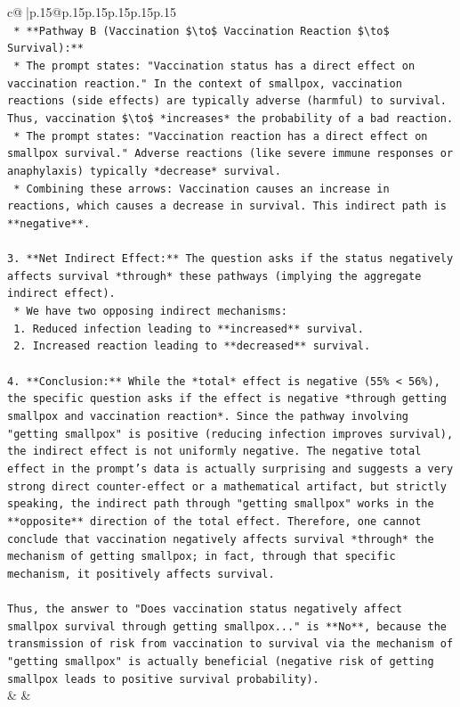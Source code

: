 \documentclass{article}
\begin{document}
{\begin{supertabular}{c@{$\;$}|p{.15\linewidth}@{}p{.15\linewidth}p{.15\linewidth}p{.15\linewidth}p{.15\linewidth}p{.15\linewidth}}
{{{\\ 
\texttt{    *   **Pathway B (Vaccination \$\textbackslash{}to\$ Vaccination Reaction \$\textbackslash{}to\$ Survival):**} \\
\texttt{        *   The prompt states: "Vaccination status has a direct effect on vaccination reaction." In the context of smallpox, vaccination reactions (side effects) are typically adverse (harmful) to survival. Thus, vaccination \$\textbackslash{}to\$ *increases* the probability of a bad reaction.} \\
\texttt{        *   The prompt states: "Vaccination reaction has a direct effect on smallpox survival." Adverse reactions (like severe immune responses or anaphylaxis) typically *decrease* survival.} \\
\texttt{        *   Combining these arrows: Vaccination causes an increase in reactions, which causes a decrease in survival. This indirect path is **negative**.} \\
\\ 
\texttt{3.  **Net Indirect Effect:** The question asks if the status negatively affects survival *through* these pathways (implying the aggregate indirect effect).} \\
\texttt{    *   We have two opposing indirect mechanisms:} \\
\texttt{        1.  Reduced infection leading to **increased** survival.} \\
\texttt{        2.  Increased reaction leading to **decreased** survival.} \\
\\ 
\texttt{4.  **Conclusion:** While the *total* effect is negative (55\% < 56\%), the specific question asks if the effect is negative *through getting smallpox and vaccination reaction*. Since the pathway involving "getting smallpox" is positive (reducing infection improves survival), the indirect effect is not uniformly negative. The negative total effect in the prompt's data is actually surprising and suggests a very strong direct counter{-}effect or a mathematical artifact, but strictly speaking, the indirect path through "getting smallpox" works in the **opposite** direction of the total effect. Therefore, one cannot conclude that vaccination negatively affects survival *through* the mechanism of getting smallpox; in fact, through that specific mechanism, it positively affects survival.} \\
\\ 
\texttt{Thus, the answer to "Does vaccination status negatively affect smallpox survival through getting smallpox..." is **No**, because the transmission of risk from vaccination to survival via the mechanism of "getting smallpox" is actually beneficial (negative risk of getting smallpox leads to positive survival probability).} \\
            }
        }
    }
    & & \\ \\


\end{supertabular}}
\end{document}
